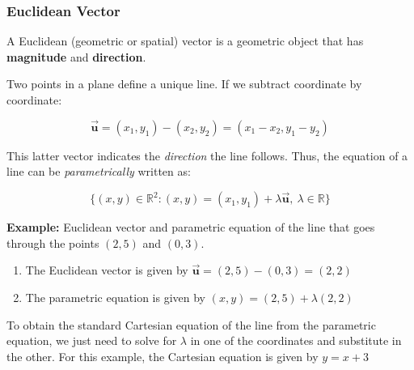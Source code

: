 \documentclass[11pt]{article}
\providecommand{\tightlist}{%
      \setlength{\itemsep}{0pt}\setlength{\parskip}{0pt}}
\begin{document}
\hypertarget{euclidean-vector}{%
\subsubsection{Euclidean Vector}\label{euclidean-vector}}

A Euclidean (geometric or spatial) vector is a geometric object that has
\textbf{magnitude} and \textbf{direction}.

Two points in a plane define a unique line. If we subtract coordinate by
coordinate:

\[
\vec{\mathbf{u}} = (x_1, y_1) - (x_2, y_2) = (x_1 - x_2, y_1 - y_2)
\]

This latter vector indicates the \emph{direction} the line follows.
Thus, the equation of a line can be \emph{parametrically} written as:

\[
\{(x,y)\in\mathbb{R}^2 : (x, y) = (x_1, y_1) + \lambda\vec{\mathbf{u}}, \ \lambda\in\mathbb{R}\}
\]

\textbf{Example:} Euclidean vector and parametric equation of the line
that goes through the points \((2,5)\) and \((0,3)\).

\begin{enumerate}
\def\labelenumi{\arabic{enumi}.}
\tightlist
\item
  The Euclidean vector is given by
  \(\vec{\mathbf{u}} = (2,5)-(0,3) = (2,2)\)
\item
  The parametric equation is given by \((x,y) = (2,5) + \lambda(2,2)\)
\end{enumerate}

To obtain the standard Cartesian equation of the line from the
parametric equation, we just need to solve for \(\lambda\) in one of the
coordinates and substitute in the other. For this example, the Cartesian
equation is given by \(y = x + 3\)
\end{document}
